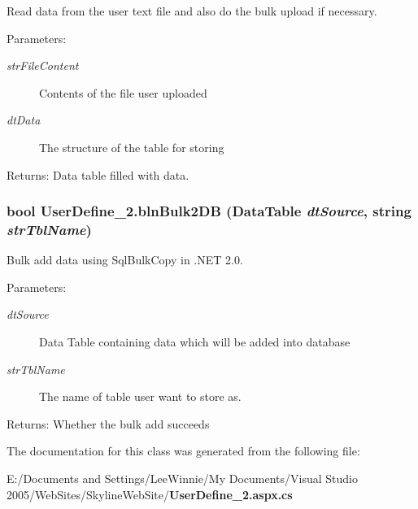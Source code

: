 Read data from the user text file and also do the bulk upload if necessary. 

\begin{Desc}
\item[Parameters:]
\begin{description}
\item[{\em str\-File\-Content}]Contents of the file user uploaded\item[{\em dt\-Data}]The structure of the table for storing\end{description}
\end{Desc}
\begin{Desc}
\item[Returns:]Data table filled with data.\end{Desc}
\subsubsection{\setlength{\rightskip}{0pt plus 5cm}bool User\-Define\_\-2.bln\-Bulk2DB (Data\-Table {\em dt\-Source}, string {\em str\-Tbl\-Name})\hspace{0.3cm}{\tt  [private]}}\label{class_user_define__2_43557ffdfc9f4257959a78e4da2fd887}


Bulk add data using Sql\-Bulk\-Copy in .NET 2.0. 

\begin{Desc}
\item[Parameters:]
\begin{description}
\item[{\em dt\-Source}]Data Table containing data which will be added into database\item[{\em str\-Tbl\-Name}]The name of table user want to store as.\end{description}
\end{Desc}
\begin{Desc}
\item[Returns:]Whether the bulk add succeeds\end{Desc}


The documentation for this class was generated from the following file:\begin{CompactItemize}
\item 
E:/Documents and Settings/Lee\-Winnie/My Documents/Visual Studio 2005/Web\-Sites/Skyline\-Web\-Site/{\bf User\-Define\_\-2.aspx.cs}\end{CompactItemize}
